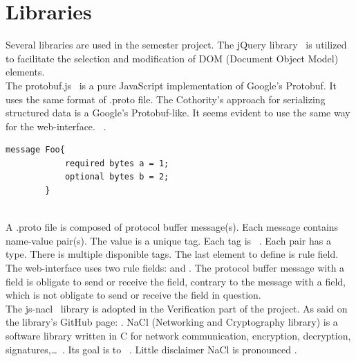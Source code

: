 \documentclass[11pt, a4paper, twoside, openright, openany]{book} %
\begin{document}
\section{Libraries}
Several libraries are used in the semester project.
\newline
The jQuery library~\cite{query} is utilized to
facilitate the selection and modification of DOM (Document Object Model) elements.\\

The protobuf.js~\cite{protobufjs} is a pure JavaScript implementation of Google's Protobuf.
It uses the same format of .proto file.
The Cothority's approach for serializing structured data is a Google's Protobuf-like.
It seems evident to use the same way for the web-interface.
\newline
{}~\cite{protobufDefi}.\\

\begin{lstlisting}[caption={Example of .proto file}, captionpos=b]
 message Foo{
            required bytes a = 1;
            optional bytes b = 2;
        }
\end{lstlisting}
\leavevmode \\

A .proto file is composed of protocol buffer message(s). Each message contains name-value pair(s).
The value is a unique tag. Each tag is ~\cite{protobufDefi}.
Each pair has a type. There is multiple disponible tags.
\newline
The last element to define is rule field. The web-interface
uses two rule fields:  and . The protocol buffer message
with a  field is obligate to send or receive the field, contrary to
the message with a  field, which is not obligate to send or receive the field in question.\\

The js-nacl~\cite{jsnacl} library is adopted in the Verification part of the project.
As said on the library's GitHub page: .
NaCl (Networking and Cryptography library) is a software library written in C for
network communication, encryption, decryption, signatures,\ldots~\cite{nacl}. Its
goal is to ~\cite{nacl}.
Little disclaimer NaCl is pronounced .\\
\end{document}
